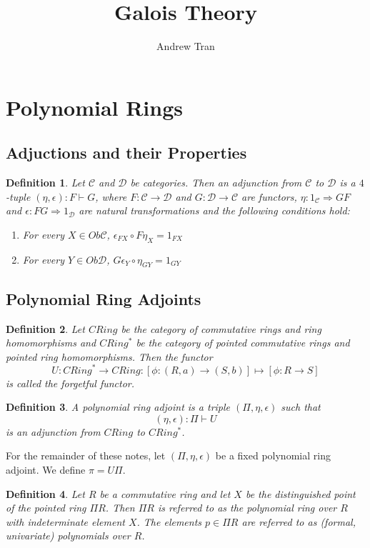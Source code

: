 \documentclass[12pt]{article}
\title{Galois Theory}
\author{Andrew Tran}
\date{}
\newtheorem{defn}{Definition}
\begin{document}
\maketitle

\section{Polynomial Rings}
\subsection{Adjuctions and their Properties}
\begin{defn}
  Let $\mathscr{C}$  and $\mathscr{D}$ be categories. Then an adjunction from $\mathscr{C}$ to $\mathscr{D}$ is a $4$-tuple $(\eta,\epsilon):F\vdash G$, where $F:\mathscr{C}\to\mathscr{D}$ and $G:\mathscr{D}\to\mathscr{C}$ are functors, $\eta:1_{\mathscr{C}}\Rightarrow GF$ and $\epsilon:FG\Rightarrow1_{\mathscr{D}}$ are natural transformations and the following conditions hold:
  \begin{enumerate}
    \item For every $X \in Ob\mathscr{C}$, $\epsilon_{FX}\circ F\eta_{X} = 1_{FX}$ 
    \item For every $Y \in Ob\mathscr{D}$, $G\epsilon_{Y}\circ\eta_{GY} = 1_{GY}$
  \end{enumerate}
\end{defn}

\subsection{Polynomial Ring Adjoints}
\begin{defn}
  Let $CRing$ be the category of commutative rings and ring homomorphisms and $CRing^{*}$ be the category of pointed commutative rings and pointed ring homomorphisms. Then the functor $$U:CRing^{*}\to CRing:[\phi:(R,a)\to(S,b)]\mapsto[\phi:R\to S]$$ is called the forgetful functor.
\end{defn}

\begin{defn}
  A polynomial ring adjoint is a triple $(\Pi,\eta,\epsilon)$ such that $$(\eta,\epsilon):\Pi\vdash U$$ is an adjunction from $CRing$ to $CRing^{*}$.
\end{defn}

\noindent For the remainder of these notes, let $(\Pi,\eta,\epsilon)$ be a fixed polynomial ring adjoint. We define $\pi = U\Pi$. 

\begin{defn} 
  Let $R$ be a commutative ring and let $X$ be the distinguished point of the pointed ring $\Pi R$. Then $\Pi R$ is referred to as the polynomial ring over $R$ with indeterminate element $X$. The elements $p \in \Pi R$ are referred to as (formal, univariate) polynomials over $R$.
\end{defn}
\end{document}
